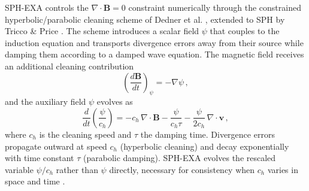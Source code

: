 SPH-EXA controls the $\nabla \cdot \mathbf{B} = 0$ constraint numerically through the constrained hyperbolic/parabolic cleaning scheme of Dedner et al. \cite{Dedner2002}, extended to SPH by Tricco \& Price \cite{TriccoPrice2012}. The scheme introduces a scalar field $\psi$ that couples to the induction equation and transports divergence errors away from their source while damping them according to a damped wave equation. 
The magnetic field receives an additional cleaning contribution
\begin{equation}
    \left(\frac{d\mathbf{B}}{dt}\right)_\psi = -\nabla \psi\,,
    \label{eq:cleaning_dBdt}
\end{equation}
and the auxiliary field $\psi$ evolves as
\begin{equation}
    \frac{d}{dt}\!\left(\frac{\psi}{c_h}\right) = -c_h \, \nabla \cdot \mathbf{B} - \frac{\psi}{c_h \tau} - \frac{\psi}{2c_h}\, \nabla \cdot \mathbf{v}\,,
    \label{eq:psi_evolution}
\end{equation}
where $c_h$ is the cleaning speed and $\tau$ the damping time. %
Divergence errors propagate outward at speed $c_h$ (hyperbolic cleaning) and decay exponentially with time constant $\tau$ (parabolic damping). SPH-EXA evolves the rescaled variable $\psi/c_h$ rather than $\psi$ directly, necessary for consistency when $c_h$ varies in space and time \cite{Tricco2016}.


